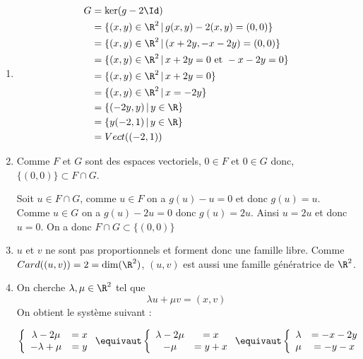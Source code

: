 \begin{correction}
\begin{enumerate}
\item 
\begin{align*}
G&=\ker( g-2\Id)\\
  &= \{ (x,y)\in \R^2\, |\, g(x,y)-2(x,y) =(0,0)\}\\
  &= \{ (x,y)\in \R^2\, |\, (x+2y,-x-2y) =(0,0)\}\\
  &= \{ (x,y)\in \R^2\, |\, x+2y=0 \text{ et } -x-2y = 0 \}\\
  &= \{ (x,y)\in \R^2\, |\, x+2y=0\}\\
  &= \{ (x,y)\in \R^2\, |\, x=-2y\}\\
  &= \{ (-2y,y)\, |\,y \in \R\}\\
  &=\{ y(-2,1)\, |\,y \in \R\}\\
  &= Vect(( -2,1))
\end{align*}


\item  Comme $F$ et $G$ sont des espaces vectoriels, $0 \in F$ et $0\in G$ donc, 
$\{ (0,0) \} \subset F\cap G$. 


Soit $u \in F\cap G$, comme $u \in F$ on a $g(u)-u=0$ et  donc $g(u)=u$.  Comme $u \in G$ on a $g(u)-2u =0$ donc $g(u) =2u$. Ainsi 
$u=2u$ et donc $u=0$. On a donc $F\cap G\subset \{ (0,0)\}$


\item $u$ et $v$ ne sont pas proportionnels et forment donc une famille libre. Comme $Card((u,v)) = 2 = \dim(\R^2)$, $(u,v)$ est aussi une famille génératrice de $\R^2$. 

\item On cherche $\lambda, \mu \in \R^2$ tel que 
$$\lambda u+\mu v =(x,v)$$
On obtient le système suivant : 

$$\left\{ \begin{array}{cc}
\lambda -2\mu &= x\\
-\lambda +\mu &=y
\end{array}
\right. \equivaut\left\{ \begin{array}{cc}
\lambda -2\mu &= x\\
-\mu &=y+ x
\end{array}
\right. \equivaut\left\{ \begin{array}{cc}
\lambda &= -x-2y\\
\mu &=-y- x
\end{array}
\right.$$


\end{enumerate}
\end{correction}
